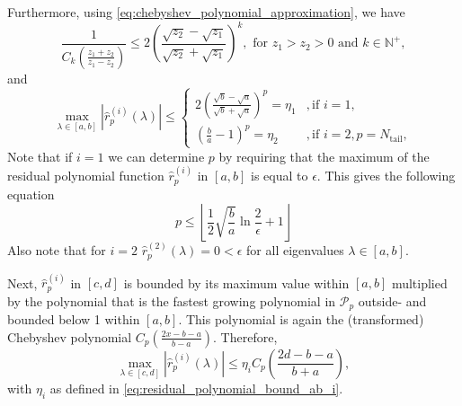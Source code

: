 Furthermore, using \cref{eq:chebyshev_polynomial_approximation}, we have
\begin{equation}
    \frac{1}{C_{k}\left(\frac{z_1 + z_2}{z_1 - z_2}\right)} \leq 2 \left(\frac{\sqrt{z_2} - \sqrt{z_1}}{\sqrt{z_2} + \sqrt{z_1}}\right)^k, \text{ for } z_1 > z_2 > 0 \text{ and } k \in \mathbb{N}^+,
    \label{eq:chebyshev_polynomial_bound}
\end{equation}
and
\begin{equation}
    \max_{\lambda \in [a,b]} |\hat{r}^{(i)}_p(\lambda)| \leq
    \begin{cases}
        2\left(\frac{\sqrt{b}-\sqrt{a}}{\sqrt{b}+\sqrt{a}}\right)^p=\eta_1 & , \text{if } i = 1,                      \\
        \left(\frac{b}{a}-1\right)^p=\eta_2                                & , \text{if } i = 2, p = N_{\text{tail}},
    \end{cases}
    \label{eq:residual_polynomial_bound_ab_i}
\end{equation}
Note that if $i=1$ we can determine $p$ by requiring that the maximum of the residual polynomial function $\hat{r}^{(i)}_p$ in $[a,b]$ is equal to $\epsilon$. This gives the following equation
\begin{equation}
    p \leq \left\lfloor\frac{1}{2}\sqrt{\frac{b}{a}}\ln{\frac{2}{\epsilon}} + 1\right\rfloor
    \label{eq:chebyshev_degree_p}
\end{equation}
Also note that for $i=2$ $\hat{r}^{(2)}_p(\lambda) = 0 < \epsilon$ for all eigenvalues $\lambda \in [a,b]$.

Next, $\hat{r}^{(i)}_p$ in $[c,d]$ is bounded by its maximum value within $[a,b]$ multiplied by the polynomial that is the fastest growing polynomial in $\mathcal{P}_{p}$ outside- and bounded below 1 within $[a,b]$. This polynomial is again the (transformed) Chebyshev polynomial $C_{p}\left(\frac{2x - b - a}{b - a}\right)$. Therefore,
\begin{equation*}
    \max_{\lambda \in [c,d]} |\hat{r}^{(i)}_p(\lambda)| \leq \eta_i C_{p}\left(\frac{2d - b - a}{b + a}\right),
\end{equation*}
with $\eta_i$ as defined in \cref{eq:residual_polynomial_bound_ab_i}.

